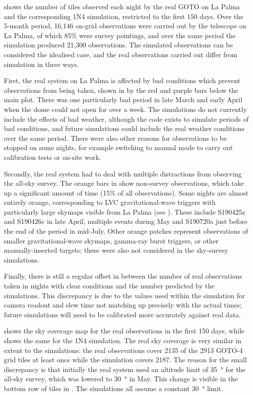 \begin{colsection}
 shows the number of tiles observed each night by the real GOTO on La Palma and the corresponding 1N4 simulation, restricted to the first 150 days. Over the 5-month period, 16,146 on-grid observations were carried out by the telescope on La Palma, of which 85\% were survey pointings, and over the same period the simulation produced 21,300 observations. The simulated observations can be considered the idealised case, and the real observations carried out differ from simulation in three ways.

First, the real system on La Palma is affected by bad conditions which prevent observations from being taken, shown in  by the red and purple bars below the main plot. There was one particularly bad period in late March and early April when the dome could not open for over a week. The simulations do not currently include the effects of bad weather, although the code exists to simulate periods of bad conditions, and future simulations could include the real weather conditions over the same period. There were also other reasons for observations to be stopped on some nights, for example switching to manual mode to carry out calibration tests or on-site work.

Secondly, the real system had to deal with multiple distractions from observing the all-sky survey. The orange bars in  show non-survey observations, which take up a significant amount of time (15\% of all observations). Some nights are almost entirely orange, corresponding to LVC gravitational-wave triggers with particularly large skymaps visible from La Palma (see ). These include S190425z and S190426c in late April, multiple events during May and S190720a just before the end of the period in mid-July. Other orange patches represent observations of smaller gravitational-wave skymaps, gamma-ray burst triggers, or other manually-inserted targets; these were also not considered in the sky-survey simulations.

Finally, there is still a regular offset in  between the number of real observations taken in nights with clear conditions and the number predicted by the simulations. This discrepancy is due to the values used within the simulation for camera readout and slew time not matching up precisely with the actual times; future simulations will need to be calibrated more accurately against real data.

 shows the sky coverage map for the real observations in the first 150 days, while  shows the same for the 1N4 simulation. The real sky coverage is very similar in extent to the simulations: the real observations cover 2135 of the 2913 GOTO-4 grid tiles at least once while the simulation covers 2187. The reason for the small discrepancy is that initially the real system used an altitude limit of \SI{35}{\degree} for the all-sky survey, which was lowered to \SI{30}{\degree} in May. This change is visible in the bottom row of tiles in . The simulations all assume a constant \SI{30}{\degree} limit.


\end{colsection}
